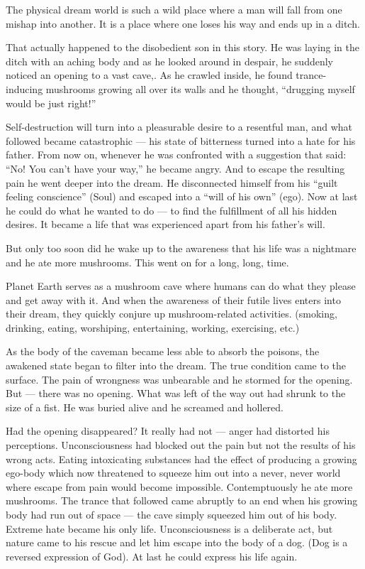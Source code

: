 \documentclass[landscape,twocolumn,letterpaper]{article}
\newcommand{\emdash}{---}
\begin{document}
The physical dream world is such a wild place where a man will fall
from one mishap into another. It is a place where one loses his way
and ends up in a ditch.

That actually happened to the disobedient son in this story. He was
laying in the ditch with an aching body and as he looked around in
despair, he suddenly noticed an opening to a vast cave,. As he crawled
inside, he found trance-inducing mushrooms growing all over its walls
and he thought, ``drugging myself would be just right!''

Self-destruction will turn into a pleasurable desire to a resentful
man, and what followed became catastrophic {\emdash} his state of
bitterness turned into a hate for his father. From now on, whenever he
was confronted with a suggestion that said: ``No! You can't have your
way,'' he became angry. And to escape the resulting pain he went
deeper into the dream. He disconnected himself from his ``guilt
feeling conscience'' (Soul) and escaped into a ``will of his own''
(ego). Now at last he could do what he wanted to do {\emdash} to find
the fulfillment of all his hidden desires. It became a life that was
experienced apart from his father's will.

But only too soon did he wake up to the awareness that his life was a
nightmare and he ate more mushrooms. This went on for a long, long,
time.

Planet Earth serves as a mushroom cave where humans can do what they
please and get away with it. And when the awareness of their futile
lives enters into their dream, they quickly conjure up
mushroom-related activities. (smoking, drinking, eating, worshiping,
entertaining, working, exercising, etc.)

As the body of the caveman became less able to absorb the poisons, the
awakened state began to filter into the dream. The true condition came
to the surface. The pain of wrongness was unbearable and he stormed
for the opening.  But {\emdash} there was no opening. What was left of
the way out had shrunk to the size of a fist. He was buried alive and
he screamed and hollered.

Had the opening disappeared? It really had not {\emdash} anger had
distorted his perceptions. Unconsciousness had blocked out the pain
but not the results of his wrong acts. Eating intoxicating substances
had the effect of producing a growing ego-body which now threatened to
squeeze him out into a never, never world where escape from pain would
become impossible. Contemptuously he ate more mushrooms. The trance
that followed came abruptly to an end when his growing body had run
out of space --- the cave simply squeezed him out of his body. Extreme
hate became his only life. Unconsciousness is a deliberate act, but
nature came to his rescue and let him escape into the body of a
dog. (Dog is a reversed expression of God). At last he could express
his life again.
\end{document}
